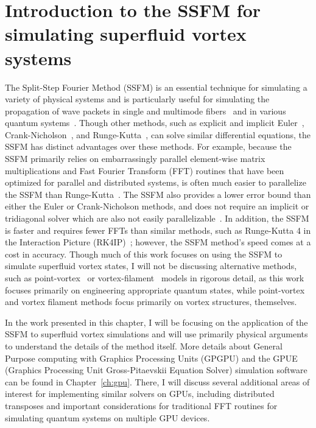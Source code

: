 \chapter{Introduction to the SSFM for simulating superfluid vortex systems}
\label{ch:splitop}
The Split-Step Fourier Method (SSFM) is an essential technique for simulating a variety of physical systems and is particularly useful for simulating the propagation of wave packets in single and multimode fibers~\cite{agrawal2000, sinkin2003, meirelles2005, min2003} and in various quantum systems~\cite{bayindir2015, weideman1986, wang2005}.
Though other methods, such as explicit and implicit Euler~\cite{butcher2016}, Crank-Nicholson~\cite{crank1947}, and Runge-Kutta~\cite{butcher2016}, can solve similar differential equations, the SSFM has distinct advantages over these methods.
For example, because the SSFM primarily relies on embarrassingly parallel element-wise matrix multiplications and Fast Fourier Transform (FFT) routines that have been optimized for parallel and distributed systems, is often much easier to parallelize the SSFM than Runge-Kutta~\cite{murray2011}.
The SSFM also provides a lower error bound than either the Euler or Crank-Nicholson methods, and does not require an implicit or tridiagonal solver \cite{conte2017, thomas1949} which are also not easily parallelizable~\cite{goddeke2010, wang1981, sweet1977}.
In addition, the SSFM is faster and requires fewer FFTs than similar methods, such as Runge-Kutta 4 in the Interaction Picture (RK4IP)~\cite{brehler2017}; however, the SSFM method's speed comes at a cost in accuracy.
Though much of this work focuses on using the SSFM to simulate superfluid vortex states, I will not be discussing alternative methods, such as point-vortex~\cite{benzi1992} or vortex-filament~\cite{schwarz1988} models in rigorous detail, as this work focuses primarily on engineering appropriate quantum states, while point-vortex and vortex filament methods focus primarily on vortex structures, themselves.

In the work presented in this chapter, I will be focusing on the application of the SSFM to superfluid vortex simulations and will use primarily physical arguments to understand the details of the method itself.
More details about General Purpose computing with Graphics Processing Units (GPGPU) and the GPUE (Graphics Processing Unit Gross-Pitaevskii Equation Solver) simulation software can be found in Chapter~\ref{ch:gpu}.
There, I will discuss several additional areas of interest for implementing similar solvers on GPUs, including distributed transposes and important considerations for traditional FFT routines for simulating quantum systems on multiple GPU devices.


